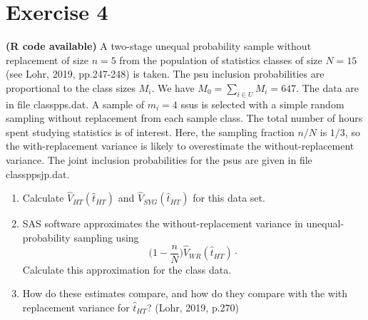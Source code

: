 \documentclass[12pt]{article}
\begin{document}
\section*{Exercise 4}
\textbf{\color{ForestGreen}(R code available)} A two-stage unequal probability sample without replacement of size $n=5$ from the population of statistics classes of size $N=15$ (see Lohr, 2019, pp.247-248) is taken. The psu inclusion probabilities
are proportional to the class sizes $M_i$. We have $M_0=\sum_{i \in U}M_i=647$. The data are in file classpps.dat. A sample of $m_i=4$ ssus is selected with a simple random sampling without replacement from each sample class. The total number of hours spent studying statistics is of interest. Here,
the sampling fraction $n/N$ is $1/3$, so the with-replacement variance is likely to
overestimate the without-replacement variance. The joint inclusion probabilities for
the psus are given in file classppsjp.dat.
\begin{enumerate}
\item Calculate $\hat{V}_{HT}(\hat{t}_{HT})$ and $\hat{V}_{SYG}(\hat{t}_{HT})$ for this data set.
\item SAS software approximates the without-replacement variance in unequal-probability
sampling using
$$\Big(1-\frac{n}{N}\Big)\hat{V}_{WR}(\hat{t}_{HT})\cdot$$
Calculate this approximation for the class data.
\item How do these estimates compare, and how do they compare with the with replacement
variance for $\hat{t}_{HT}$? \hfill (Lohr, 2019, p.270)\\
\end{enumerate}
\end{document}
